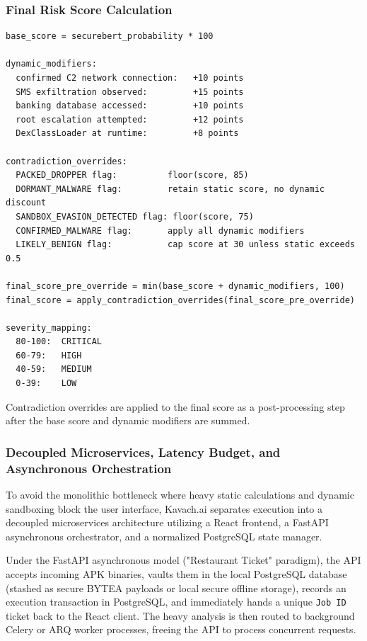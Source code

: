 \documentclass[10pt,a4paper]{article}
\begin{document}
\subsubsection*{Final Risk Score Calculation}
\begin{rulebox}
\begin{verbatim}
base_score = securebert_probability * 100

dynamic_modifiers:
  confirmed C2 network connection:   +10 points
  SMS exfiltration observed:         +15 points
  banking database accessed:         +10 points
  root escalation attempted:         +12 points
  DexClassLoader at runtime:         +8 points

contradiction_overrides:
  PACKED_DROPPER flag:          floor(score, 85)
  DORMANT_MALWARE flag:         retain static score, no dynamic discount
  SANDBOX_EVASION_DETECTED flag: floor(score, 75)
  CONFIRMED_MALWARE flag:       apply all dynamic modifiers
  LIKELY_BENIGN flag:           cap score at 30 unless static exceeds 0.5

final_score_pre_override = min(base_score + dynamic_modifiers, 100)
final_score = apply_contradiction_overrides(final_score_pre_override)

severity_mapping:
  80-100:  CRITICAL
  60-79:   HIGH
  40-59:   MEDIUM
  0-39:    LOW
\end{verbatim}
\end{rulebox}

Contradiction overrides are applied to the final score as a post-processing step after the base score and dynamic modifiers are summed.

\subsubsection*{Decoupled Microservices, Latency Budget, and Asynchronous Orchestration}

To avoid the monolithic bottleneck where heavy static calculations and dynamic sandboxing block the user interface, Kavach.ai separates execution into a decoupled microservices architecture utilizing a React frontend, a FastAPI asynchronous orchestrator, and a normalized PostgreSQL state manager.

Under the FastAPI asynchronous model ("Restaurant Ticket" paradigm), the API accepts incoming APK binaries, vaults them in the local PostgreSQL database (stashed as secure BYTEA payloads or local secure offline storage), records an execution transaction in PostgreSQL, and immediately hands a unique \texttt{Job ID} ticket back to the React client. The heavy analysis is then routed to background Celery or ARQ worker processes, freeing the API to process concurrent requests.
\end{document}

